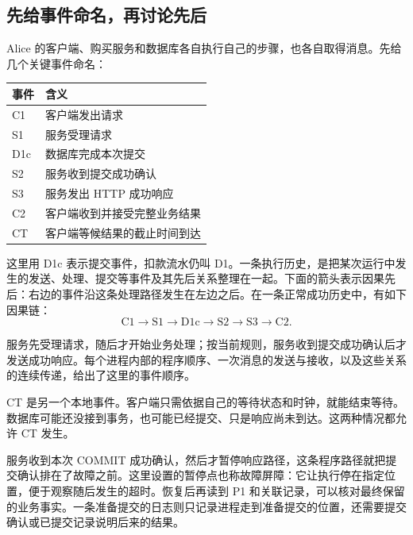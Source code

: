 \subsection*{先给事件命名，再讨论先后}

Alice 的客户端、购买服务和数据库各自执行自己的步骤，也各自取得消息。先给几个关键事件命名：

\begin{center}
\begin{minipage}{\linewidth}
\small
\begin{tabularx}{\linewidth}{p{.12\linewidth}X}
\toprule
\textbf{事件} & \textbf{含义} \\
\midrule
C1 & 客户端发出请求 \\
S1 & 服务受理请求 \\
D1c & 数据库完成本次提交 \\
S2 & 服务收到提交成功确认 \\
S3 & 服务发出 HTTP 成功响应 \\
C2 & 客户端收到并接受完整业务结果 \\
CT & 客户端等候结果的截止时间到达 \\
\bottomrule
\end{tabularx}
\end{minipage}
\end{center}

这里用 D1c 表示提交事件，扣款流水仍叫 D1。一条执行历史，是把某次运行中发生的发送、处理、提交等事件及其先后关系整理在一起。下面的箭头表示因果先后：右边的事件沿这条处理路径发生在左边之后。在一条正常成功历史中，有如下因果链：
\[
  \mathrm{C1}\longrightarrow\mathrm{S1}\longrightarrow\mathrm{D1c}
  \longrightarrow\mathrm{S2}\longrightarrow\mathrm{S3}\longrightarrow\mathrm{C2}.
\]

服务先受理请求，随后才开始业务处理；按当前规则，服务收到提交成功确认后才发送成功响应。每个进程内部的程序顺序、一次消息的发送与接收，以及这些关系的连续传递，给出了这里的事件顺序。

CT 是另一个本地事件。客户端只需依据自己的等待状态和时钟，就能结束等待。数据库可能还没接到事务，也可能已经提交、只是响应尚未到达。这两种情况都允许 CT 发生。



服务收到本次 COMMIT 成功确认，然后才暂停响应路径，这条程序路径就把提交确认排在了故障之前。这里设置的暂停点也称故障屏障：它让执行停在指定位置，便于观察随后发生的超时。恢复后再读到 P1 和关联记录，可以核对最终保留的业务事实。一条准备提交的日志则只记录进程走到准备提交的位置，还需要提交确认或已提交记录说明后来的结果。

